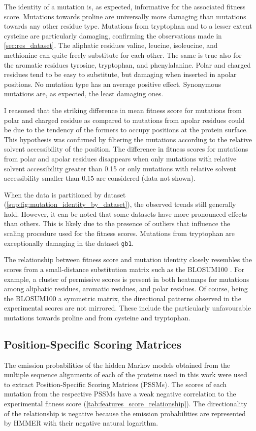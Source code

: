 The identity of a mutation is, as expected, informative for the associated fitness score.
Mutations towards proline are universally more damaging than mutations towards any other residue type.
Mutations from tryptophan and to a lesser extent cysteine are particularly damaging, confirming the observations made in \cref{sec:res_dataset}.
The aliphatic residues valine, leucine, isoleucine, and methionine can quite freely substitute for each other.
The same is true also for the aromatic residues tyrosine, tryptophan, and phenylalanine.
Polar and charged residues tend to be easy to substitute, but damaging when inserted in apolar positions.
No mutation type has an average positive effect.
Synonymous mutations are, as expected, the least damaging ones.

I reasoned that the striking difference in mean fitness score for mutations from polar and charged residue as compared to mutations from apolar residues could be due to the tendency of the formers to occupy positions at the protein surface.
This hypothesis was confirmed by filtering the mutations according to the relative solvent accessibility of the position.
The difference in fitness scores for mutations from polar and apolar residues disappears when only mutations with relative solvent accessibility greater than \num{0.15} or only mutations with relative solvent accessibility smaller than \num{0.15} are considered (data not shown).

When the data is partitioned by dataset (\cref{sup:fig:mutation_identity_by_dataset}), the observed trends still generally hold.
However, it can be noted that some datasets have more pronounced effects than others.
This is likely due to the presence of outliers that influence the scaling procedure used for the fitness scores.
Mutations from tryptophan are exceptionally damaging in the dataset \texttt{gb1}.

The relationship between fitness score and mutation identity closely resembles the scores from a small-distance substitution matrix such as the BLOSUM100 \parencite[\cref{subfig:blosum100}]{Henikoff1992}.
For example, a cluster of permissive scores is present in both heatmaps for mutations among aliphatic residues, aromatic residues, and polar residues.
Of course, being the BLOSUM100 a symmetric matrix, the directional patterns observed in the experimental scores are not mirrored.
These include the particularly unfavourable mutations towards proline and from cysteine and tryptophan.

\subsection{Position-Specific Scoring Matrices}
The emission probabilities of the hidden Markov models obtained from the multiple sequence alignments of each of the proteins used in this work were used to extract Position-Specific Scoring Matrices (PSSMs).
The scores of each mutation from the respective PSSMs have a weak negative correlation to the experimental fitness score (\cref{tab:features_score_relationship}).
The directionality of the relationship is negative because the emission probabilities are represented by HMMER with their negative natural logarithm.

